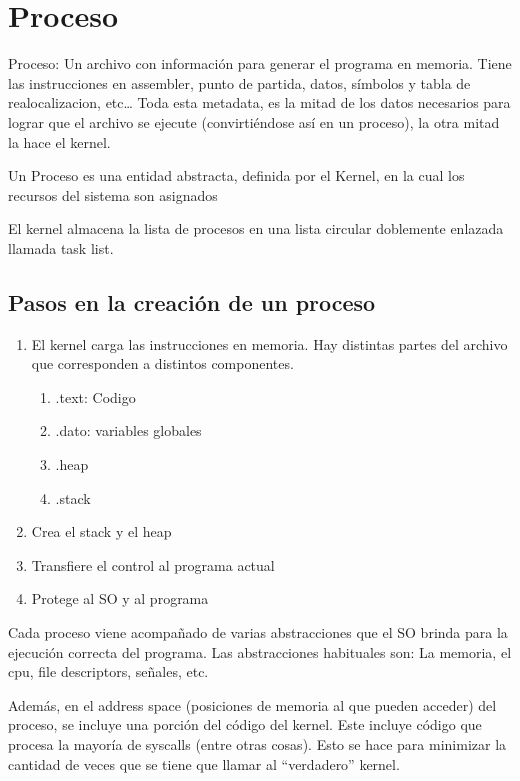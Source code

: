 \documentclass{article}
\begin{document}
\section{Proceso}\label{proceso}

Proceso: Un archivo con información para generar el programa en memoria.
Tiene las instrucciones en assembler, punto de partida, datos, símbolos
y tabla de realocalizacion, etc\ldots{} Toda esta metadata, es la mitad
de los datos necesarios para lograr que el archivo se ejecute
(convirtiéndose así en un proceso), la otra mitad la hace el kernel.

Un Proceso es una entidad abstracta, definida por el Kernel, en la cual
los recursos del sistema son asignados

El kernel almacena la lista de procesos en una lista circular doblemente
enlazada llamada task list.

\subsection{Pasos en la creación de un
proceso}\label{pasos-en-la-creaciuxf3n-de-un-proceso}

\begin{enumerate}
\def\labelenumi{\arabic{enumi}.}
\item
  El kernel carga las instrucciones en memoria. Hay distintas partes del
  archivo que corresponden a distintos componentes.

  \begin{enumerate}
  \def\labelenumii{\alph{enumii}.}
  \item
    .text: Codigo
  \item
    .dato: variables globales
  \item
    .heap
  \item
    .stack
  \end{enumerate}
\item
  Crea el stack y el heap
\item
  Transfiere el control al programa actual
\item
  Protege al SO y al programa
\end{enumerate}

Cada proceso viene acompañado de varias abstracciones que el SO brinda
para la ejecución correcta del programa. Las abstracciones habituales
son: La memoria, el cpu, file descriptors, señales, etc.

Además, en el address space (posiciones de memoria al que pueden
acceder) del proceso, se incluye una porción del código del kernel. Este
incluye código que procesa la mayoría de syscalls (entre otras cosas).
Esto se hace para minimizar la cantidad de veces que se tiene que llamar
al ``verdadero'' kernel.
\end{document}
